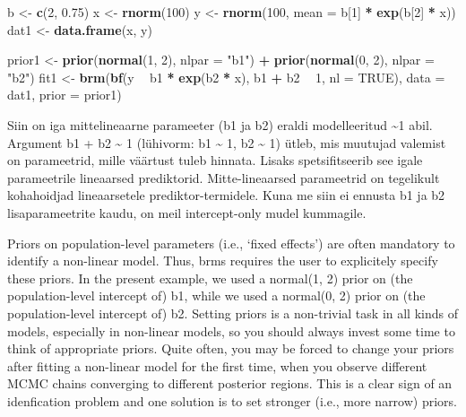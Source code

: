\documentclass[]{book}
\newenvironment{Shaded}{\begin{snugshade}}{\end{snugshade}}
\newcommand{\KeywordTok}[1]{\textcolor[rgb]{0.13,0.29,0.53}{\textbf{#1}}}
\newcommand{\DataTypeTok}[1]{\textcolor[rgb]{0.13,0.29,0.53}{#1}}
\newcommand{\DecValTok}[1]{\textcolor[rgb]{0.00,0.00,0.81}{#1}}
\newcommand{\FloatTok}[1]{\textcolor[rgb]{0.00,0.00,0.81}{#1}}
\newcommand{\StringTok}[1]{\textcolor[rgb]{0.31,0.60,0.02}{#1}}
\newcommand{\OtherTok}[1]{\textcolor[rgb]{0.56,0.35,0.01}{#1}}
\newcommand{\OperatorTok}[1]{\textcolor[rgb]{0.81,0.36,0.00}{\textbf{#1}}}
\newcommand{\NormalTok}[1]{#1}
\begin{document}
\begin{Shaded}
\begin{Highlighting}[]
\NormalTok{b <-}\StringTok{ }\KeywordTok{c}\NormalTok{(}\DecValTok{2}\NormalTok{, }\FloatTok{0.75}\NormalTok{)}
\NormalTok{x <-}\StringTok{ }\KeywordTok{rnorm}\NormalTok{(}\DecValTok{100}\NormalTok{)}
\NormalTok{y <-}\StringTok{ }\KeywordTok{rnorm}\NormalTok{(}\DecValTok{100}\NormalTok{, }\DataTypeTok{mean =}\NormalTok{ b[}\DecValTok{1}\NormalTok{] }\OperatorTok{*}\StringTok{ }\KeywordTok{exp}\NormalTok{(b[}\DecValTok{2}\NormalTok{] }\OperatorTok{*}\StringTok{ }\NormalTok{x))}
\NormalTok{dat1 <-}\StringTok{ }\KeywordTok{data.frame}\NormalTok{(x, y)}

\NormalTok{prior1 <-}\StringTok{ }\KeywordTok{prior}\NormalTok{(}\KeywordTok{normal}\NormalTok{(}\DecValTok{1}\NormalTok{, }\DecValTok{2}\NormalTok{), }\DataTypeTok{nlpar =} \StringTok{"b1"}\NormalTok{) }\OperatorTok{+}
\StringTok{  }\KeywordTok{prior}\NormalTok{(}\KeywordTok{normal}\NormalTok{(}\DecValTok{0}\NormalTok{, }\DecValTok{2}\NormalTok{), }\DataTypeTok{nlpar =} \StringTok{"b2"}\NormalTok{)}
\NormalTok{fit1 <-}\StringTok{ }\KeywordTok{brm}\NormalTok{(}\KeywordTok{bf}\NormalTok{(y }\OperatorTok{~}\StringTok{ }\NormalTok{b1 }\OperatorTok{*}\StringTok{ }\KeywordTok{exp}\NormalTok{(b2 }\OperatorTok{*}\StringTok{ }\NormalTok{x), b1 }\OperatorTok{+}\StringTok{ }\NormalTok{b2 }\OperatorTok{~}\StringTok{ }\DecValTok{1}\NormalTok{, }\DataTypeTok{nl =} \OtherTok{TRUE}\NormalTok{),}
            \DataTypeTok{data =}\NormalTok{ dat1, }\DataTypeTok{prior =}\NormalTok{ prior1)}
\end{Highlighting}
\end{Shaded}

Siin on iga mittelineaarne parameeter (b1 ja b2) eraldi modelleeritud
\textasciitilde{}1 abil. Argument b1 + b2 \textasciitilde{} 1 (lühivorm:
b1 \textasciitilde{} 1, b2 \textasciitilde{} 1) ütleb, mis muutujad
valemist on parameetrid, mille väärtust tuleb hinnata. Lisaks
spetsifitseerib see igale parameetrile lineaarsed prediktorid.
Mitte-lineaarsed parameetrid on tegelikult kohahoidjad lineaarsetele
prediktor-termidele. Kuna me siin ei ennusta b1 ja b2 lisaparameetrite
kaudu, on meil intercept-only mudel kummagile.

Priors on population-level parameters (i.e., `fixed effects') are often
mandatory to identify a non-linear model. Thus, brms requires the user
to explicitely specify these priors. In the present example, we used a
normal(1, 2) prior on (the population-level intercept of) b1, while we
used a normal(0, 2) prior on (the population-level intercept of) b2.
Setting priors is a non-trivial task in all kinds of models, especially
in non-linear models, so you should always invest some time to think of
appropriate priors. Quite often, you may be forced to change your priors
after fitting a non-linear model for the first time, when you observe
different MCMC chains converging to different posterior regions. This is
a clear sign of an idenfication problem and one solution is to set
stronger (i.e., more narrow) priors.
\end{document}
